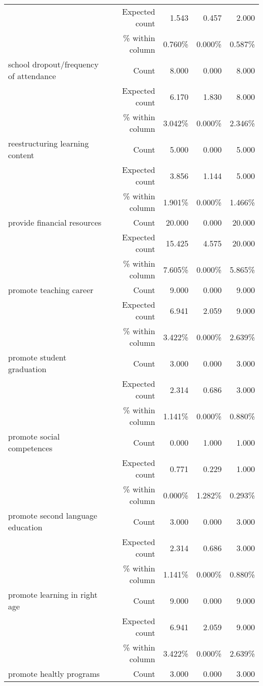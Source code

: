 \documentclass[6pt, oneside]{article}   	%
\begin{document}
\begin{table}[h]
{\begin{tabular}{lrrrr}
			 & Expected count & 1.543 & 0.457 & 2.000  \\
			 &  \% within column & 0.760\% & 0.000\% & 0.587\%  \\
			school dropout/frequency of attendance & Count & 8.000 & 0.000 & 8.000  \\
			 & Expected count & 6.170 & 1.830 & 8.000  \\
			 &  \% within column & 3.042\% & 0.000\% & 2.346\%  \\
			reestructuring learning content & Count & 5.000 & 0.000 & 5.000  \\
			 & Expected count & 3.856 & 1.144 & 5.000  \\
			 &  \% within column & 1.901\% & 0.000\% & 1.466\%  \\
			provide financial resources & Count & 20.000 & 0.000 & 20.000  \\
			 & Expected count & 15.425 & 4.575 & 20.000  \\
			 &  \% within column & 7.605\% & 0.000\% & 5.865\%  \\
			promote teaching career & Count & 9.000 & 0.000 & 9.000  \\
			 & Expected count & 6.941 & 2.059 & 9.000  \\
			 &  \% within column & 3.422\% & 0.000\% & 2.639\%  \\
			promote student graduation & Count & 3.000 & 0.000 & 3.000  \\
			 & Expected count & 2.314 & 0.686 & 3.000  \\
			 &  \% within column & 1.141\% & 0.000\% & 0.880\%  \\
			promote social competences & Count & 0.000 & 1.000 & 1.000  \\
			 & Expected count & 0.771 & 0.229 & 1.000  \\
			 &  \% within column & 0.000\% & 1.282\% & 0.293\%  \\
			promote second language education & Count & 3.000 & 0.000 & 3.000  \\
			 & Expected count & 2.314 & 0.686 & 3.000  \\
			 &  \% within column & 1.141\% & 0.000\% & 0.880\%  \\
			promote learning in right age & Count & 9.000 & 0.000 & 9.000  \\
			 & Expected count & 6.941 & 2.059 & 9.000  \\
			 &  \% within column & 3.422\% & 0.000\% & 2.639\%  \\
			promote healtly programs & Count & 3.000 & 0.000 & 3.000  \\

\end{tabular}}
\end{table}
\end{document}
